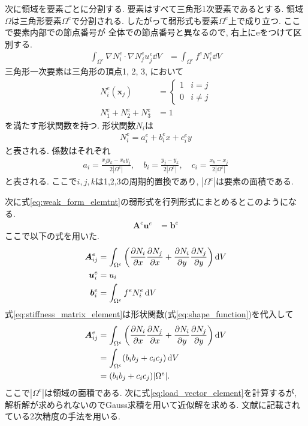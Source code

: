 \documentclass[paper=a4]{jlreq}
\begin{document}
次に領域を要素ごとに分割する. 要素はすべて三角形1次要素であるとする.
領域$\Omega$は三角形要素$\Omega^e$で分割される.
したがって弱形式も要素$\Omega^e$上で成り立つ. ここで要素内部での節点番号が
全体での節点番号と異なるので, 右上にeをつけて区別する.
\begin{align}
    \int_{\Omega^e} \nabla N^e_i \cdot \nabla N^e_j u^e_j \dd{V}
    &= \int_{\Omega^e} f^eN_i^e\dd{V} \label{eq:weak_form_elemtnt}
\end{align}
三角形一次要素は三角形の頂点1, 2, 3, において
\begin{align}
    N^e_i(\bm{x}_j) &= 
    \begin{cases}
        1 & i = j \\
        0 & i \neq j 
    \end{cases}\\
    N^e_1 + N^e_2 + N^e_3 &= 1
\end{align}
を満たす形状関数を持つ.
形状関数$N_i$は
\begin{align}
    N^e_i = a^e_i +b^e_i x +c^e_i y \label{eq:shape_function}
\end{align}
と表される.
係数はそれぞれ
\begin{align}
    a_i = \frac{x_jy_k - x_ky_j}{2|\Omega^e|},\quad
    b_i = \frac{y_j- y_k}{2|\Omega^e|},\quad
    c_i = \frac{x_k - x_j}{2|\Omega^e|} 
\end{align}
と表される. ここで$i,j,k$は1,2,3の周期的置換であり, $|\Omega^e|$は要素の面積である.

次に式\eqref{eq:weak_form_elemtnt}の弱形式を行列形式にまとめるとこのようになる.
\begin{align}
    \bm{A}^e\bm{u}^e &= \bm{b}^e
\end{align}
ここで以下の式を用いた.
\begin{align}
    \bm{A}^e_{ij}
    &= \int_{\Omega^e} \qty(\pdv{N_i}{x}\pdv{N_j}{x} + \pdv{N_i}{y}\pdv{N_j}{y}) \dd{V}
    \label{eq:stiffness_matrix_element}\\
    \bm{u}^e_i &= u_i \\
    \bm{b}^e_i
    &= \int_{\Omega^e} f^eN_i^e\dd{V}
    \label{eq:load_vector_element}
\end{align}
式\eqref{eq:stiffness_matrix_element}は形状関数(式\eqref{eq:shape_function})を代入して
\begin{align}
    \begin{split}
        \bm{A}^e_{ij}
        &= \int_{\Omega^e} \qty(\pdv{N_i}{x}\pdv{N_j}{x} + \pdv{N_i}{y}\pdv{N_j}{y}) \dd{V}  \\
        &= \int_{\Omega^e} (b_ib_j+c_ic_j)\dd{V} \\
        &= (b_ib_j+c_ic_j)|\Omega^e|.
    \end{split}
\end{align}
ここで$|\Omega^e|$は領域の面積である.
次に式\eqref{eq:load_vector_element}を計算するが, 
解析解が求められないのでGauss求積を用いて近似解を求める.
文献\cite{Wriggers2006}に記載されている2次精度の手法を用いる.
\end{document}
